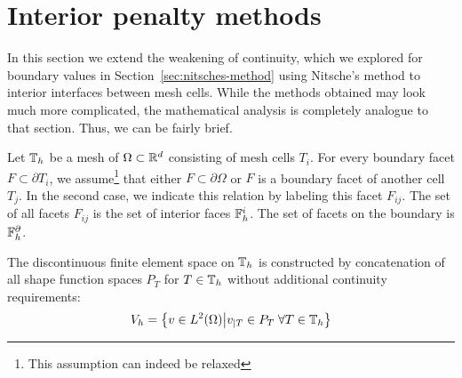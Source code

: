 \section{Interior penalty methods}
\label{sec:interior-penalty}

\begin{intro}
  In this section we extend the weakening of continuity, which we
  explored for boundary values in Section~\ref{sec:nitsches-method}
  using Nitsche's method to interior interfaces between mesh
  cells. While the methods obtained may look much more complicated,
  the mathematical analysis is completely analogue to that
  section. Thus, we can be fairly brief.
\end{intro}

\begin{definition}
  Let $\mathbb T_h$ be a mesh of $\Omega \subset \mathbb R^d$ consisting of mesh
  cells $T_i$. For every boundary facet $F\subset \partial T_i$, we
  assume\footnote{This assumption can indeed be relaxed} that either
  $F \subset \partial \Omega$ or $F$ is a boundary facet of another
  cell $T_j$. In the second case, we indicate this relation by
  labeling this facet $F_{ij}$. The set of all facets $F_{ij}$ is the
  set of interior faces $\mathbb F_h^i$. The set of facets on the boundary is
  $\mathbb F_h^\partial$.
\end{definition}

\begin{definition}
  The discontinuous finite element space on $\mathbb T_h$ is constructed by
  concatenation of all shape function spaces $P_T$ for $T\in \mathbb T_h$
  without additional continuity requirements:
  \begin{gather}
    V_h = \bigl\{v\in L^2(\Omega) \big|
    v_{|T} \in P_T \;\forall T\in \mathbb T_h\bigr\}
  \end{gather}
\end{definition}





